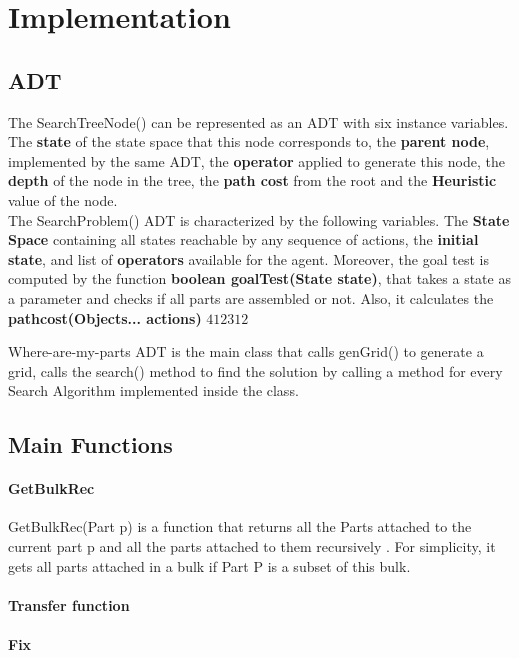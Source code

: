 \chapter{Implementation}
\section{ADT}
The SearchTreeNode() can be represented as an ADT with six instance variables. The \textbf{state} of the state space that this node corresponds to, the \textbf{parent node}, implemented by the same ADT, the \textbf{operator} applied to generate this node, the \textbf{depth} of the node in the tree, the \textbf{path cost} from the root and the \textbf{Heuristic} value of the node.\\

The SearchProblem() ADT is characterized by the following variables. The \textbf{State Space} containing all states reachable by any sequence of actions, the \textbf{initial state}, and list of \textbf{operators} available for the agent. Moreover, the goal test is computed by the function \textbf{boolean goalTest(State state)}, that takes a state as a parameter and checks if all parts are assembled or not. Also, it calculates the \textbf{pathcost(Objects... actions)} $412312$%

Where-are-my-parts ADT is the main class that calls genGrid() to generate a grid, calls the search() method to find the solution by calling a method for every Search Algorithm implemented inside the class. 

\section{Main Functions}
\subsubsection{GetBulkRec}
GetBulkRec(Part p) is a function that returns all the Parts attached to the current part p and all the parts attached to them recursively . For simplicity, it gets all parts attached in a bulk if Part P is a subset of this bulk.



\subsubsection{Transfer function}

\subsubsection{Fix}


